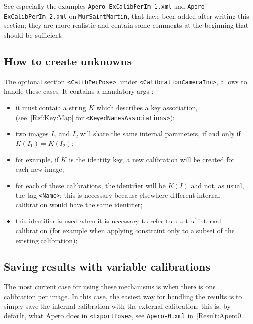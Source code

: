 See especially the examples {\tt Apero-ExCalibPerIm-1.xml} and
{\tt Apero-ExCalibPerIm-2.xml} on {\tt MurSaintMartin}, that have
been added after writing this section; they are more realistic
and contain some comments at the beginning that should be
sufficient.

\subsection{How to create unknowns}

The optional section {\tt <CalibPerPose>}, under {\tt <CalibrationCameraInc>},
allows to handle these cases. It contains a mandatory args {\tt   <KeyPose2Cal>}:


\begin{itemize}
    \item it must contain a string $K$ which describes  a key association,
          (see~\ref{Ref:Key:Map}  for {\tt <KeyedNamesAssociations>});
    \item  two images  $I_1$ and $I_2$ will share the same internal parameters,
           if and only if $K(I_1) = K(I_2)$;
     \item for example,  if $K$ is the identity key, a new calibration will
           be created for each new image;

     \item  for each of these calibrations, the identifier will be $K(I)$ and not,
            as usual, the tag {\tt <Name>}; this is necessary because elsewhere
             different internal calibration would have the same identifier;

      \item this identifier is used when it is necessary to refer
            to a set of internal calibration (for example when applying
            constraint only to a subset of the existing calibration);

\end{itemize}

\subsection{Saving  results with  variable calibrations}

The most current case for using these mechanisms is when there is one calibration
per image. In this case, the easiest way for handling the results is  to
simply  save the internal calibration  with the external calibration;
this is, by default, what Apero does  in {\tt <ExportPose>}, see
{\tt Apero-0.xml} in~\ref{Result:Apero0}.


